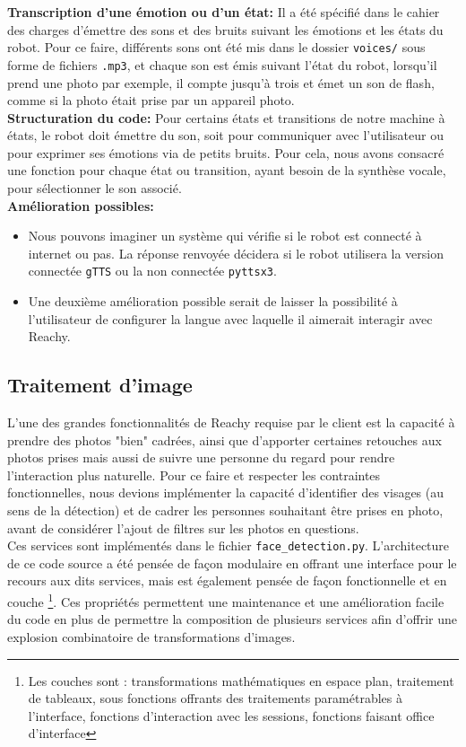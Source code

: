 \documentclass[a4paper,french]{article}
\begin{document}
\textbf{Transcription d'une émotion ou d'un état:}
Il a été spécifié dans le cahier des charges d'émettre des sons et des bruits suivant les émotions et les états du robot. Pour ce faire, différents sons ont été mis dans le dossier \texttt{voices/} sous forme de fichiers \texttt{.mp3}, et chaque son est émis suivant l'état du robot, lorsqu'il prend une photo par exemple, il compte jusqu'à trois et émet un son de flash, comme si la photo était prise par un appareil photo.\\

\textbf{Structuration du code:} 
Pour certains états et transitions de notre machine à états,  le robot doit émettre du son, soit pour communiquer avec l'utilisateur ou pour exprimer ses émotions via de petits bruits. Pour cela, nous avons consacré une fonction pour chaque état ou transition, ayant besoin de la synthèse vocale, pour sélectionner le son associé. \\

\textbf{Amélioration possibles:} 
\begin{itemize}
    \item Nous pouvons imaginer un système qui vérifie si le robot est connecté à internet ou pas. La réponse renvoyée décidera si le robot utilisera la version connectée \texttt{gTTS} ou la non connectée \texttt{pyttsx3}.
    \item Une deuxième amélioration possible serait de laisser la possibilité à l'utilisateur de configurer la langue avec laquelle il aimerait interagir avec Reachy.
\end{itemize}

\subsection{Traitement d'image}
L'une des grandes fonctionnalités de Reachy requise par le client est la capacité à prendre des photos "bien" cadrées, ainsi que d'apporter certaines retouches aux photos prises mais aussi de suivre une personne du regard pour rendre l'interaction plus naturelle. Pour ce faire et respecter les contraintes fonctionnelles, nous devions implémenter la capacité d'identifier des visages (au sens de la détection) et de cadrer les personnes souhaitant être prises en photo, avant de considérer l'ajout de filtres sur les photos en questions.\\

Ces services sont implémentés dans le fichier \texttt{face\_detection.py}. L'architecture de ce code source a été pensée de façon modulaire en offrant une interface pour le recours aux dits services, mais est également pensée de façon fonctionnelle et en couche \footnote{Les couches sont : transformations mathématiques en espace plan, traitement de tableaux, sous fonctions offrants des traitements paramétrables à l'interface, fonctions d'interaction avec les sessions, fonctions faisant office d'interface}. Ces propriétés permettent une maintenance et une amélioration facile du code en plus de permettre la composition de plusieurs services afin d'offrir une explosion combinatoire de transformations d'images.
\end{document}
